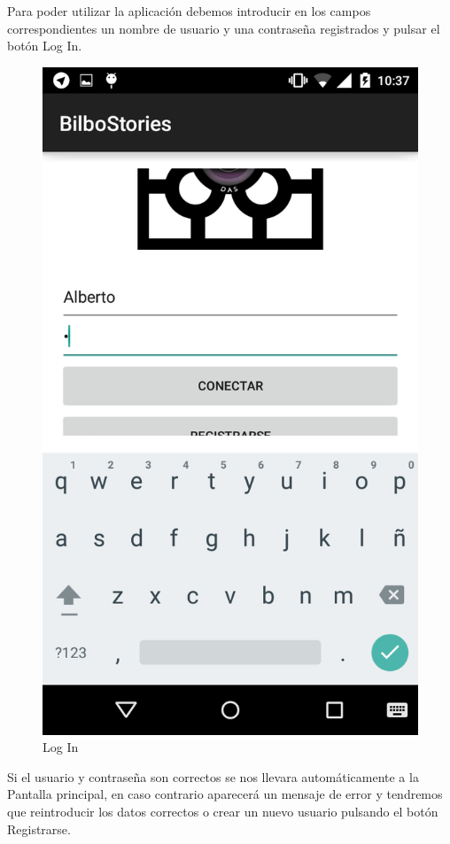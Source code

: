 \documentclass[11pt,a4paper, titlepage]{article}
\begin{document}
Para poder utilizar la aplicación debemos introducir en los campos correspondientes un nombre de usuario y una contraseña registrados y pulsar el botón Log In.
	
	\begin{figure}[hbtp]
		\centering
		\includegraphics[scale = 0.25 ]{img/1}
		\caption{Log In}
		\label{}
	\end{figure}
	
	Si el usuario y contraseña son correctos se nos llevara automáticamente a la Pantalla principal, en caso contrario aparecerá un mensaje de error y tendremos que reintroducir los datos correctos o crear un nuevo usuario pulsando el botón Registrarse.
	
\end{document}
